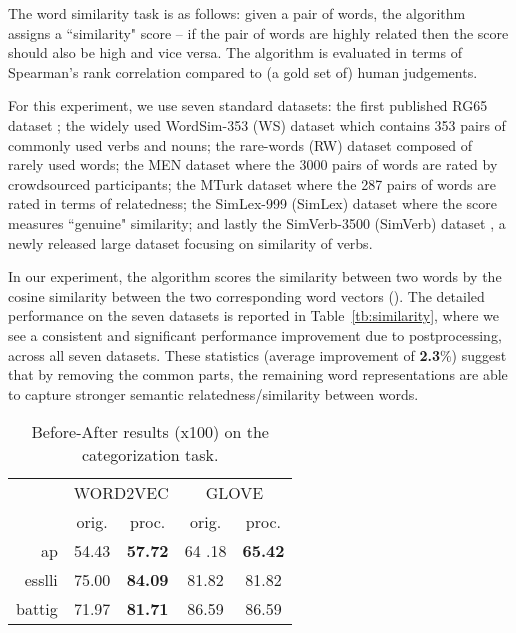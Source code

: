 \documentclass{article} \usepackage{acl2017,times}
\begin{document}
The  word similarity task is as follows: given a pair of words, the algorithm assigns a ``similarity" score -- if the pair of words are highly related then the score should also be high and vice versa. The algorithm is evaluated in terms of Spearman's rank correlation compared to (a gold set of) human judgements.

For this experiment, we use seven standard datasets: the first published RG65 dataset \citep{rubenstein1965contextual}; the widely used WordSim-353 (WS) dataset \citep{finkelstein2001placing} which contains 353 pairs of commonly used verbs and nouns; the rare-words (RW) dataset \citep{luong2013better} composed of rarely used words; the MEN dataset \citep{bruni2014multimodal} where the 3000 pairs of words are rated by crowdsourced participants; the MTurk dataset \citep{radinsky2011word} where the 287 pairs of words are rated in terms of relatedness;  the SimLex-999 (SimLex) dataset \citep{hill2016simlex} where the score measures ``genuine" similarity; and lastly the SimVerb-3500 (SimVerb) dataset \citep{gerz2016simverb}, a newly released large dataset focusing on similarity of verbs.



In our experiment, the algorithm scores the similarity between two words by the cosine similarity between the two corresponding word vectors ().  
The detailed performance on the seven datasets is reported in Table~\ref{tb:similarity}, where we see   a consistent and significant performance improvement due to postprocessing, across all seven datasets. These statistics (average improvement of {\bf 2.3}\%) suggest that by removing the common parts, the remaining word representations are able to capture stronger semantic relatedness/similarity between words. 



\begin{wraptable}{l}{0.45\textwidth}
\vspace{-10pt}
\begin{tabular}{|r||c|c||c|c|}
\hline
\multirow{2}{*}{} & \multicolumn{2}{c||}{WORD2VEC} & \multicolumn{2}{c|}{GLOVE} \\ \cline{2-5} 
                  & orig.      & proc.     & orig.    & proc.    \\ \hline
ap     &     54.43 &    \bf  57.72 &    64
.18 & \bf 65.42  \\ \hline
esslli &     75.00 &     \bf 84.09 &    81.82 &  81.82    \\ \hline
battig &     71.97 &    \bf  81.71 &    86.59 &  86.59       \\ \hline
\end{tabular}
\caption{Before-After results (x100) on the categorization task.}
\label{tb:categorization}
\vspace{-10pt}
\end{wraptable}
\end{document}

